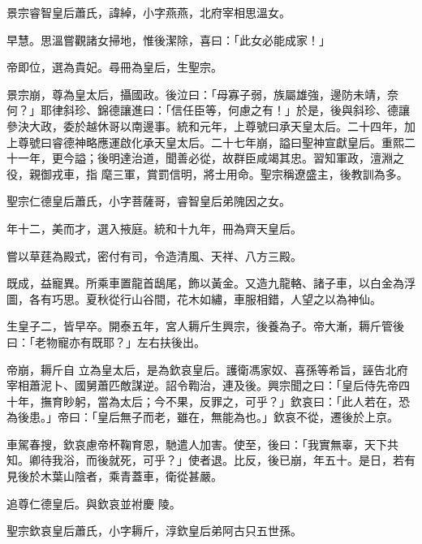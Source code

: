 \begin{pinyinscope}
 景宗睿智皇后蕭氏，諱綽，小字燕燕，北府宰相思溫女。



 早慧。思溫嘗觀諸女掃地，惟後潔除，喜曰：「此女必能成家！」



 帝即位，選為貴妃。尋冊為皇后，生聖宗。



 景宗崩，尊為皇太后，攝國政。後泣曰：「母寡子弱，族屬雄強，邊防未靖，奈何？」耶律斜珍、錦德讓進曰：「信任臣等，何慮之有！」於是，後與斜珍、德讓參決大政，委於越休哥以南邊事。統和元年，上尊號曰承天皇太后。二十四年，加上尊號曰睿德神略應運啟化承天皇太后。二十七年崩，謚曰聖神宣獻皇后。重熙二十一年，更今謚；後明達治道，聞善必從，故群臣咸竭其忠。習知軍政，澶淵之役，親御戎車，指
 麾三軍，賞罰信明，將士用命。聖宗稱遼盛主，後教訓為多。



 聖宗仁德皇后蕭氏，小字菩薩哥，睿智皇后弟隗因之女。



 年十二，美而才，選入掖庭。統和十九年，冊為齊天皇后。



 嘗以草莛為殿式，密付有司，令造清風、天祥、八方三殿。



 既成，益寵異。所乘車置龍首鴟尾，飾以黃金。又造九龍輅、諸子車，以白金為浮圖，各有巧思。夏秋從行山谷間，花木如繡，車服相錯，人望之以為神仙。



 生皇子二，皆早卒。開泰五年，宮人耨斤生興宗，後養為子。帝大漸，耨斤管後曰：「老物寵亦有既耶？」左右扶後出。



 帝崩，耨斤自
 立為皇太后，是為欽哀皇后。護衛馮家奴、喜孫等希旨，誣告北府宰相蕭泥卜、國舅蕭匹敵謀逆。詔令鞫治，連及後。興宗聞之曰：「皇后侍先帝四十年，撫育眇躬，當為太后；今不果，反罪之，可乎？」欽哀曰：「此人若在，恐為後患。」帝曰：「皇后無子而老，雖在，無能為也。」欽哀不從，遷後於上京。



 車駕春搜，欽哀慮帝杯鞠育恩，馳遣人加害。使至，後曰：「我實無辜，天下共知。卿待我浴，而後就死，可乎？」使者退。比反，後已崩，年五十。是日，若有見後於木葉山陰者，乘青蓋車，衛從甚嚴。



 追尊仁德皇后。與欽哀並袝慶
 陵。



 聖宗欽哀皇后蕭氏，小字耨斤，淳欽皇后弟阿古只五世孫。




\end{pinyinscope}
